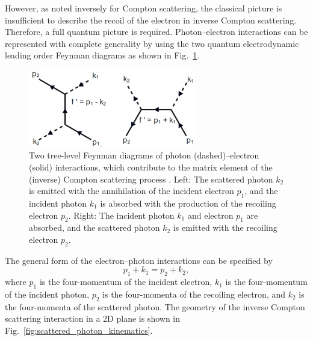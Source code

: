 \documentclass[../main.tex]{subfiles}
\begin{document}
However, as noted inversely for Compton scattering, the classical picture is insufficient to describe the recoil of the electron in inverse Compton scattering. Therefore, a full quantum picture is required. Photon--electron interactions can be represented with complete generality by using the two quantum electrodynamic leading order Feynman diagrams as shown in Fig.~\ref{fig:ICS_Feynman_diagrams}. 
\begin{figure}[!h]
\centering
\includegraphics[width=0.65\textwidth]{Figures/Photon_Production_by_Inverse_Compton_Scattering/ICS_feynman_fixed.pdf}
\caption{Two tree-level Feynman diagrams of photon (dashed)--electron (solid) interactions, which contribute to the matrix element of the (inverse) Compton scattering process \cite{berestetskii1982quantum}. Left: The scattered photon $k_{2}$ is emitted with the annihilation of the incident electron $p_{1}$, and the incident photon $k_{1}$ is absorbed with the production of the recoiling electron $p_{2}$. Right: The incident photon $k_{1}$ and electron $p_{1}$ are absorbed, and the scattered photon $k_{2}$ is emitted with the recoiling electron $p_{2}$.}
\label{fig:ICS_Feynman_diagrams}
\end{figure}
The general form of the electron--photon interactions can be specified by
\begin{equation}
p_{1} + k_{1} = p_{2} + k_{2},
\label{eq:ICS_process}
\end{equation}
where $p_{1}$ is the four-momentum of the incident electron, $k_{1}$ is the four-momentum of the incident photon, $p_{2}$ is the four-momenta of the recoiling electron, and $k_{2}$ is the four-momenta of the scattered photon. The geometry of the inverse Compton scattering interaction in a 2D plane is shown in Fig.~\ref{fig:scattered_photon_kinematics}.
\end{document}

